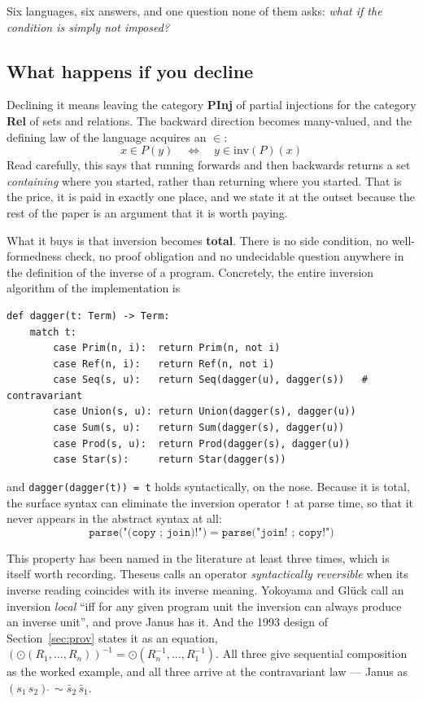 \documentclass[runningheads,envcountsame]{llncs}
\newcommand{\Rel}{\textbf{Rel}}
\newcommand{\PInj}{\textbf{PInj}}
\begin{document}
Six languages, six answers, and one question none of them asks: \emph{what if the
condition is simply not imposed?}

\subsection{What happens if you decline}

Declining it means leaving the category \PInj{} of partial injections for the
category \Rel{} of sets and relations. The backward direction becomes many-valued,
and the defining law of the language acquires an $\in$:
\[
    x \in P(y) \quad\iff\quad y \in \mathrm{inv}(P)(x)
\]
Read carefully, this says that running forwards and then backwards returns a set
\emph{containing} where you started, rather than returning where you started. That
is the price, it is paid in exactly one place, and we state it at the outset
because the rest of the paper is an argument that it is worth paying.

What it buys is that inversion becomes \textbf{total}. There is no side condition,
no well-formedness check, no proof obligation and no undecidable question anywhere
in the definition of the inverse of a program. Concretely, the entire inversion
algorithm of the implementation is

\begin{lstlisting}
def dagger(t: Term) -> Term:
    match t:
        case Prim(n, i):  return Prim(n, not i)
        case Ref(n, i):   return Ref(n, not i)
        case Seq(s, u):   return Seq(dagger(u), dagger(s))   # contravariant
        case Union(s, u): return Union(dagger(s), dagger(u))
        case Sum(s, u):   return Sum(dagger(s), dagger(u))
        case Prod(s, u):  return Prod(dagger(s), dagger(u))
        case Star(s):     return Star(dagger(s))
\end{lstlisting}

\noindent and \texttt{dagger(dagger(t)) = t} holds syntactically, on the nose.
Because it is total, the surface syntax can eliminate the inversion operator
\texttt{!} at parse time, so that it never appears in the abstract syntax at all:
\[
    \texttt{parse("(copy ; join)!")} \;=\; \texttt{parse("join! ; copy!")}
\]

This property has been named in the literature at least three times, which is
itself worth recording. Theseus calls an operator \emph{syntactically reversible}
when its inverse reading coincides with its inverse meaning. Yokoyama and Gl\"uck
call an inversion \emph{local} ``iff for any given program unit the inversion can
always produce an inverse unit'', and prove Janus has it. And the 1993 design of
Section~\ref{sec:prov} states it as an equation,
$(\odot(R_1,\dots,R_n))^{-1} = \odot(R_n^{-1},\dots,R_1^{-1})$. All three give
sequential composition as the worked example, and all three arrive at the
contravariant law --- Janus as $(s_1\,s_2)\breve{\;} \sim \breve{s_2}\,\breve{s_1}$.
\end{document}
